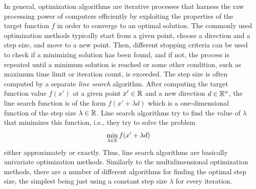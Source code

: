\documentclass[a4paper,english,titlepage,12pt]{article}
\newcommand{\R}{\ensuremath\mathbb{R}}
\begin{document}
In general, optimization algorithms are iterative processes that harness the raw processing power of computers efficiently by exploiting the properties of the target function $f$ in order to converge to an optimal solution.
The commonly used optimization methods typically start from a given point, choose a direction and a step size, and move to a new point. Then, different stopping criteria can be used to check if a minimizing solution has been found, and if not, the process is repeated until a minimum solution is reached or some other condition, such as maximum time limit or iteration count, is exceeded.
The step size is often computed by a separate \emph{line search} algorithm. After computing the target function value $f(x')$ at a given point $x'\in \R$ and a new direction $d\in \R^n$, the line search function is of the form $f(x' + \lambda d)$ which is a one-dimensional function of the step size $\lambda\in \R$. Line search algorithms try to find the value of $\lambda$ that minimizes this function, i.e., they try to solve the problem
\begin{equation}\label{eq:ls}
\min_{\lambda\in \R} f(x' + \lambda d)
\end{equation}
either approximately or exactly. Thus, line search algorithms are basically univariate optimization methods. Similarly to the multidimensional optimization methods, there are a number of different algorithms for finding the optimal step size, the simplest being just using a constant step size $\lambda$ for every iteration. 
\end{document}
